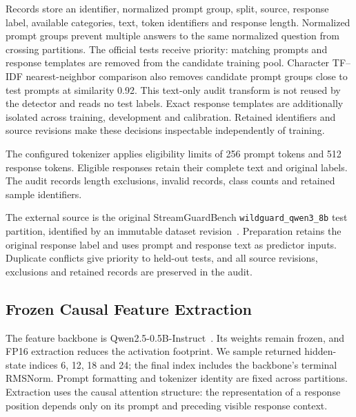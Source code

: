 Records store an identifier, normalized prompt group, split, source, response label, available categories, text, token identifiers and response length. Normalized prompt groups prevent multiple answers to the same normalized question from crossing partitions. The official tests receive priority: matching prompts and response templates are removed from the candidate training pool. Character TF--IDF nearest-neighbor comparison also removes candidate prompt groups close to test prompts at similarity 0.92. This text-only audit transform is not reused by the detector and reads no test labels. Exact response templates are additionally isolated across training, development and calibration. Retained identifiers and source revisions make these decisions inspectable independently of training.

The configured tokenizer applies eligibility limits of 256 prompt tokens and 512 response tokens. Eligible responses retain their complete text and original labels. The audit records length exclusions, invalid records, class counts and retained sample identifiers.

The external source is the original StreamGuardBench \texttt{wildguard\_qwen3\_8b} test partition, identified by an immutable dataset revision~\cite{streamguardbench2025data}. Preparation retains the original response label and uses prompt and response text as predictor inputs. Duplicate conflicts give priority to held-out tests, and all source revisions, exclusions and retained records are preserved in the audit.




\subsection{Frozen Causal Feature Extraction}
The feature backbone is Qwen2.5-0.5B-Instruct~\cite{qwen2024qwen25}. Its weights remain frozen, and FP16 extraction reduces the activation footprint. We sample returned hidden-state indices 6, 12, 18 and 24; the final index includes the backbone's terminal RMSNorm. Prompt formatting and tokenizer identity are fixed across partitions. Extraction uses the causal attention structure: the representation of a response position depends only on its prompt and preceding visible response context.

